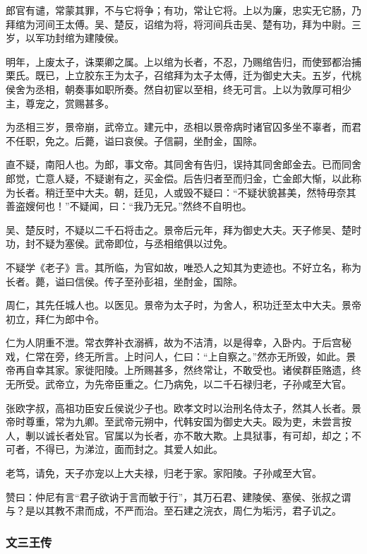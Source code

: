 \documentclass[]{article}
\begin{document}
郎官有谴，常蒙其罪，不与它将争；有功，常让它将。上以为廉，忠实无它肠，乃拜绾为河间王太傅。吴、楚反，诏绾为将，将河间兵击吴、楚有功，拜为中尉。三岁，以军功封绾为建陵侯。

明年，上废太子，诛栗卿之属。上以绾为长者，不忍，乃赐绾告归，而使郅都治捕栗氏。既已，上立胶东王为太子，召绾拜为太子太傅，迁为御史大夫。五岁，代桃侯舍为丞相，朝奏事如职所奏。然自初宦以至相，终无可言。上以为敦厚可相少主，尊宠之，赏赐甚多。

为丞相三岁，景帝崩，武帝立。建元中，丞相以景帝病时诸官囚多坐不辜者，而君不任职，免之。后薨，谥曰哀侯。子信嗣，坐酎金，国除。

直不疑，南阳人也。为郎，事文帝。其同舍有告归，误持其同舍郎金去。已而同舍郎觉，亡意人疑，不疑谢有之，买金偿。后告归者至而归金，亡金郎大惭，以此称为长者。稍迁至中大夫。朝，廷见，人或毁不疑曰：``不疑状貌甚美，然特毋奈其善盗嫂何也！''不疑闻，曰：``我乃无兄。''然终不自明也。

吴、楚反时，不疑以二千石将击之。景帝后元年，拜为御史大夫。天子修吴、楚时功，封不疑为塞侯。武帝即位，与丞相绾俱以过免。

不疑学《老子》言。其所临，为官如故，唯恐人之知其为吏迹也。不好立名，称为长者。薨，谥曰信侯。传子至孙彭祖，坐酎金，国除。

周仁，其先任城人也。以医见。景帝为太子时，为舍人，积功迁至太中大夫。景帝初立，拜仁为郎中令。

仁为人阴重不泄。常衣弊补衣溺裤，故为不洁清，以是得幸，入卧内。于后宫秘戏，仁常在旁，终无所言。上时问人，仁曰：``上自察之。''然亦无所毁，如此。景帝再自幸其家。家徙阳陵。上所赐甚多，然终常让，不敢受也。诸侯群臣赂遗，终无所受。武帝立，为先帝臣重之。仁乃病免，以二千石禄归老，子孙咸至大官。

张欧字叔，高祖功臣安丘侯说少子也。欧孝文时以治刑名侍太子，然其人长者。景帝时尊重，常为九卿。至武帝元朔中，代韩安国为御史大夫。殴为吏，未尝言按人，剸以诚长者处官。官属以为长者，亦不敢大欺。上具狱事，有可却，却之；不可者，不得已，为涕泣，面而封之。其爱人如此。

老笃，请免，天子亦宠以上大夫禄，归老于家。家阳陵。子孙咸至大官。

赞曰：仲尼有言``君子欲讷于言而敏于行''，其万石君、建陵侯、塞侯、张叔之谓与？是以其教不肃而成，不严而治。至石建之浣衣，周仁为垢污，君子讥之。

\hypertarget{header-n4056}{%
\subsubsection{文三王传}\label{header-n4056}}
\end{document}
